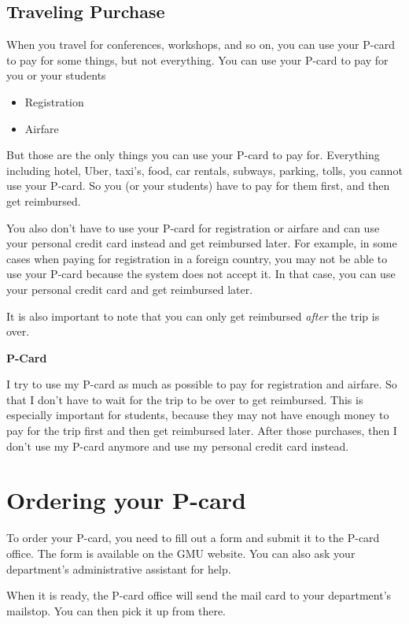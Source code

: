 \documentclass[oneside,11pt,dvipsnames]{book}
\newenvironment{commentbox}[1][]{
  \small
  \begin{marker}[\faChessPawn{}]
    {\textbf{#1}}
  }{
  \end{marker}
}
\begin{document}
\subsection{Traveling Purchase}\label{sec:travel-purchase}

When you travel for conferences, workshops, and so on, you can use your P-card to pay for some things, but not everything.  You can use your P-card to pay for you or your students
\begin{itemize}
  \item Registration
  \item Airfare
\end{itemize}


But those are the only things you can use your P-card to pay for. Everything including  hotel, Uber, taxi's, food, car rentals, subways, parking, tolls,  you cannot use your P-card. So you (or your students) have to pay for them first, and then get reimbursed. 

You also don't have to use your P-card for registration or airfare and can use your personal credit card instead and get reimbursed later. For example, in some cases when paying for registration in a foreign country, you may not be able to use your P-card because the system does not accept it. In that case, you can use your personal credit card and get reimbursed later. 

It is also important to note that you can only get reimbursed \emph{after} the trip is over. 


\begin{commentbox}[P-Card]
  I try to use my P-card as much as possible to pay for registration and airfare.  So that I don't have to wait for the trip to be over to get reimbursed. This is especially important for students, because they may not have enough money to pay for the trip first and then get reimbursed later. After those purchases, then I don't use my P-card anymore and use my personal credit card instead.
\end{commentbox}

\section{Ordering your P-card}
To order your P-card, you need to fill out a form and submit it to the P-card office. The form is available on the GMU website. You can also ask your department's administrative assistant for help. %

When it is ready, the P-card office will send the mail card to your department's mailstop. You can then pick it up from there.
\end{document}
